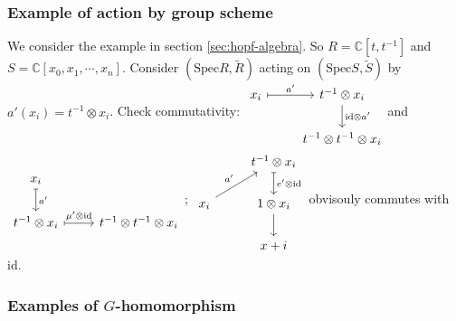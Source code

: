 \documentclass{article}
\theoremstyle{definition}
\newcommand{\Spec}{\mathrm{Spec}}
\newcommand{\ssheaf}[1]{\widetilde{#1}}
\newcommand{\tensor}[2]{#1\otimes#2}
\newcommand{\id}{\mathrm{id}}
\newcommand{\sr}[1]{(\Spec{#1},\ssheaf{#1})}
\begin{document}
\subsubsection{Example of action by group scheme}
We consider the example in section \ref{sec:hopf-algebra}. So $R = \mathbb C[t, t^{-1}]$ and $S=\mathbb C[x_0, x_1,\cdots,x_n]$. Consider $\sr R$ acting on $\sr S$ by $a'(x_i)=\tensor{t^{-1}}{x_i}$. Check commutativity:
$
\begin{tikzcd}
  {x_i}\arrow[r, mapsto, "a'"] & {\tensor{t^{-1}}{x_i}} \arrow[d, "{\tensor\id{a'}}"] \\
  & {\tensor{t^{-1}}{\tensor{t^{-1}}{x_i}}}
\end{tikzcd}
$and $
\begin{tikzcd}
  {x_i}\arrow[d, mapsto, "a'"] \\
  {\tensor{t^{-1}}{x_i}}\arrow[r, mapsto, "{\tensor{\mu'}\id}"] & {\tensor{t^{-1}}{\tensor{t^{-1}}{x_i}}}
\end{tikzcd}
$; $
\begin{tikzcd}
  & {\tensor{t^{-1}}{x_i}}\arrow[d, mapsto, "\tensor{e'}\id"] \\
  {x_i} \arrow[ru, "a'"] & {\tensor1{x_i}} \arrow[d]\\
  & {x+i}
\end{tikzcd}
$ obvisouly commutes with $\id$.

\subsubsection{Examples of $G$-homomorphism}
\end{document}
